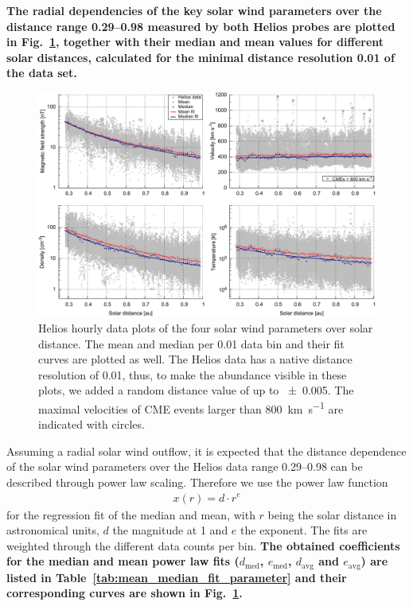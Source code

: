 \textbf{The radial dependencies of the key solar wind parameters over the distance range \SIrange{0.29}{0.98}{\au} measured by both Helios probes are plotted in Fig.~\ref{fig:radial_fit_4_thesis_light_b_skip}, together with their median and mean values for different solar distances, calculated for the minimal distance resolution \SI{0.01}{\au} of the data set.}
\begin{figure}
	\includegraphics[width=18cm]{figures/radial_fit_4_thesis_light_b_skip.pdf}
	\caption{Helios hourly data plots of the four solar wind parameters over solar distance. The mean and median per \SI{0.01}{\au} data bin and their fit curves are plotted as well. The Helios data has a native distance resolution of \SI{0.01}{\au}, thus, to make the abundance visible in these plots, we added a random distance value of up to \SI{+-0.005}{\au}. The maximal velocities of CME events larger than \SI{800}{\km\per\s} are indicated with circles.}
	\label{fig:radial_fit_4_thesis_light_b_skip}
\end{figure}
Assuming a radial solar wind outflow, it is expected that the distance dependence of the solar wind parameters over the Helios data range \SIrange{0.29}{0.98}{\au} can be described through power law scaling. Therefore we use the power law function
\begin{align}
	x(r) = d\cdot r^e	\label{eq:power_function}
\end{align}
for the regression fit of the median and mean, with $r$ being the solar distance in astronomical units, $d$ the magnitude at \SI{1}{\au} and $e$ the exponent. The fits are weighted through the different data counts per bin.
\textbf{The obtained coefficients for the median and mean power law fits ($d_\text{med}$, $e_\text{med}$, $d_\text{avg}$ and $e_\text{avg}$) are listed in Table~\ref{tab:mean_median_fit_parameter} and their corresponding curves are shown in Fig.~\ref{fig:radial_fit_4_thesis_light_b_skip}.}
